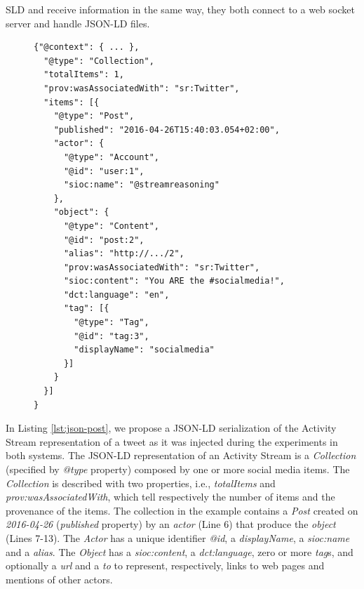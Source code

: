 SLD and \sti{} receive information in the same way, they both connect to a web socket server and handle JSON-LD files. 

\begin{figure}[ht]
\begin{minipage}{0.95\linewidth}
\begin{lstlisting}[caption={JSON representation of a Twitter micro-post. Due to the lack of space we omitted the context declaration that contains the namespace.},label=lst:json-post, style=JSON]
{"@context": { ... }, 
  "@type": "Collection",
  "totalItems": 1,
  "prov:wasAssociatedWith": "sr:Twitter",
  "items": [{
    "@type": "Post",
    "published": "2016-04-26T15:40:03.054+02:00",
    "actor": {
      "@type": "Account",
      "@id": "user:1",
      "sioc:name": "@streamreasoning"
    },
    "object": {
      "@type": "Content",
      "@id": "post:2",
      "alias": "http://.../2",
      "prov:wasAssociatedWith": "sr:Twitter",
      "sioc:content": "You ARE the #socialmedia!",
      "dct:language": "en",
      "tag": [{
        "@type": "Tag",
        "@id": "tag:3",
        "displayName": "socialmedia"
      }]
    }
  }]
}
\end{lstlisting}
\end{minipage}
\end{figure}

In Listing \ref{lst:json-post}, we propose a JSON-LD serialization of the Activity Stream representation of a tweet as it was injected during the experiments in both systems.  
The JSON-LD representation of an Activity Stream is a \textit{Collection} (specified by \textit{@type} property) composed by one or more social media items. The \textit{Collection} is described with two properties, i.e., \textit{totalItems} and \textit{prov:wasAssociatedWith}, which tell respectively the number of items and the provenance of the items. The collection in the example contains a \textit{Post} created on \textit{2016-04-26} (\textit{published} property) by  an \textit{actor} (Line 6) that produce the \textit{object} (Lines 7-13). 
The \textit{Actor} has a unique identifier  \textit{@id}, a \textit{displayName}, a \textit{sioc:name} and a \textit{alias}. The \textit{Object} has a \textit{sioc:content}, a \textit{dct:language}, zero or more \textit{tag}s, and optionally a \textit{url} and a \textit{to} to represent, respectively, links to web pages and mentions of other actors.

